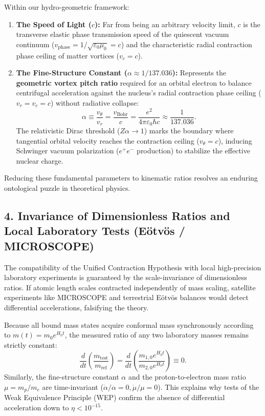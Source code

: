 Within our hydro-geometric framework:
\begin{enumerate}
    \item \textbf{The Speed of Light ($c$):} Far from being an arbitrary velocity limit, $c$ is the transverse elastic phase transmission speed of the quiescent vacuum continuum ($v_{\mathrm{phase}} = 1/\sqrt{\varepsilon_0\mu_0} = c$) and the characteristic radial contraction phase ceiling of matter vortices ($v_c = c$).
    \item \textbf{The Fine-Structure Constant ($\alpha \approx 1/137.036$):} Represents the \textbf{geometric vortex pitch ratio} required for an orbital electron to balance centrifugal acceleration against the nucleus's radial contraction phase ceiling ($v_r = v_c = c$) without radiative collapse:
          \begin{equation}
              \alpha \equiv \frac{v_\theta}{v_r} = \frac{v_{\mathrm{Bohr}}}{c} = \frac{e^2}{4\pi\varepsilon_0\hbar c} \approx \frac{1}{137.036}.
          \end{equation}
          The relativistic Dirac threshold ($Z\alpha \to 1$) marks the boundary where tangential orbital velocity reaches the contraction ceiling ($v_\theta = c$), inducing Schwinger vacuum polarization ($e^+ e^-$ production) to stabilize the effective nuclear charge.
\end{enumerate}
Reducing these fundamental parameters to kinematic ratios resolves an enduring ontological puzzle in theoretical physics.

\subsection*{4. Invariance of Dimensionless Ratios and Local Laboratory Tests (Eötvös / MICROSCOPE)}

The compatibility of the Unified Contraction Hypothesis with local high-precision laboratory experiments is guaranteed by the scale-invariance of dimensionless ratios. If atomic length scales contracted independently of mass scaling, satellite experiments like MICROSCOPE and terrestrial Eötvös balances would detect differential accelerations, falsifying the theory.

Because all bound mass states acquire conformal mass synchronously according to $m(t) = m_0 e^{H_0 t}$, the measured ratio of any two laboratory masses remains strictly constant:
\begin{equation}
    \frac{d}{dt} \left( \frac{m_{\mathrm{test}}}{m_{\mathrm{ref}}} \right) = \frac{d}{dt} \left( \frac{m_{1,0} e^{H_0 t}}{m_{2,0} e^{H_0 t}} \right) \equiv 0.
\end{equation}
Similarly, the fine-structure constant $\alpha$ and the proton-to-electron mass ratio $\mu = m_p/m_e$ are time-invariant ($\dot{\alpha}/\alpha = 0, \dot{\mu}/\mu = 0$). This explains why tests of the Weak Equivalence Principle (WEP) confirm the absence of differential acceleration down to $\eta < 10^{-15}$.

